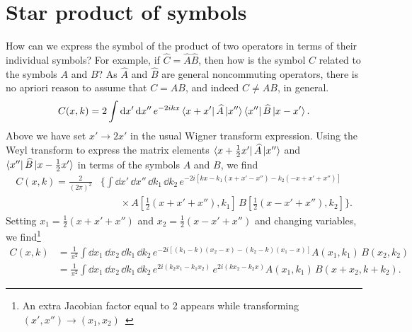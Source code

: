 \section{Star product of symbols}

How can we express the symbol of the product of two operators in terms of their individual symbols?
For example, if $\widehat{C} = \widehat{A}\widehat{B}$, then how is the symbol $C$ related to the symbols $A$ and $B$?
As $\widehat{A}$ and $\widehat{B}$ are general noncommuting operators, there is no apriori reason to assume that $C = AB$, and indeed $C \neq AB$, in general.
%
\begin{equation}
  C(x, k) = 2\int \mathrm{d}{x'}\, \mathrm{d}{x''} \,e^{-2ikx} \mathinner{\langle{x + x'}\rvert}\widehat{A}\mathinner{\lvert{x''}\rangle}\mathinner{\langle{x''}\rvert}\widehat{B}\mathinner{\lvert{x - x'}\rangle}.
\end{equation}
%
Above we have set $x' \to 2x'$ in the usual Wigner transform expression.
Using the Weyl transform to express the matrix elements $\mathinner{\langle{x + \frac{1}{2}x'}\rvert}\widehat{A}\mathinner{\lvert{x''}\rangle}$ and $\mathinner{\langle{x''}\rvert}\widehat{B}\mathinner{\lvert{x - \frac{1}{2}x'}\rangle}$ in terms of the symbols $A$ and $B$, we find
%
\begin{equation}
  \begin{aligned}
    C(x, k) = \frac{2}{(2\pi)^{2}}& \bigg\{\int \dd{x'}\, \dd{x''}\, \dd{k_{1}}\, \dd{k_{2}}\,e^{-2i[kx - k_{1}(x + x' - x'') - k_{2}(-x + x' + x'')]}\\
                                           &\qquad\times A\left[\tfrac{1}{2}(x + x' + x''), k_{1}\right]\, B\left[\tfrac{1}{2}(x - x' + x''), k_{2}\right]\bigg\}.
  \end{aligned}
\end{equation}
%
Setting $x_{1} = \frac{1}{2}(x + x' + x'')$ and $x_{2} = \frac{1}{2}(x - x' + x'')$ and changing variables, we find\footnote{An extra Jacobian factor equal to 2 appears while transforming $(x', x'') \to (x_{1}, x_{2})$~\cite[Eq.~(2.3.23) and Problem~2.3.8]{chaichian2001}}
%
\begin{equation}
  \begin{aligned}
    C(x, k) &= \frac{1}{\pi^{2}} \int \dd{x_{1}}\, \dd{x_{2}}\, \dd{k_{1}}\, \dd{k_{2}}\,e^{-2i[(k_{1} - k)(x_{2} - x) - (k_{2} - k)(x_{1} - x)]} A(x_{1}, k_{1})\, B(x_{2}, k_{2})\\
                     &= \frac{1}{\pi^{2}} \int \dd{x_{1}}\, \dd{x_{2}}\, \dd{k_{1}}\, \dd{k_{2}}\,e^{2i(k_{2}x_{1} - k_{1}x_{2})}\,e^{2i(kx_{2} - k_{2}x)} A(x_{1}, k_{1})\, B(x + x_{2}, k + k_{2}).\label{eq:moyal1}
  \end{aligned}
\end{equation}
